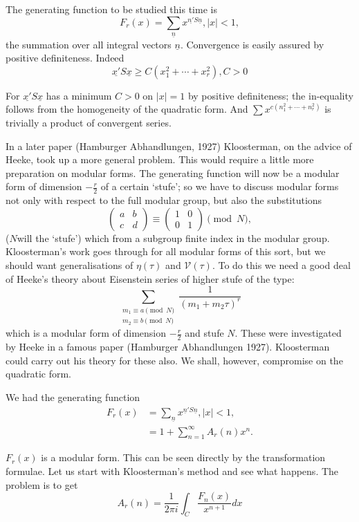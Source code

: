The generating function to be studied this time is 
$$
F_r (x) = \sum_{\underline{n}} x^{\underline{n'} S\underline{n}}, |x|<1,
$$
the summation over all integral vectors $\underline{n}$. Convergence
is easily assured by positive definiteness. Indeed
$$
\underline{x'} S\underline{x} \geq C(x_1^2 + \cdots + x_r^2), C>0
$$

For $\underline{x'} S \underline{x}$ has a minimum $C> 0$ on $|x|=1$
by positive definiteness; the in-equality follows from the homogeneity
of the quadratic form. And $\sum x^{c(n_1^2 + \cdots + n_r^2)}$ is
trivially a product of convergent series.

In a later paper (Hamburger Abhandlungen, 1927) Kloosterman, on the
advice of Heeke, took up a more general problem. This would require a
little more preparation on modular forms. The generating function will
now be a modular form of dimension $- \frac{r}{2}$ of a certain
`stufe'; so we have to discuss modular forms not only with respect to
the full modular group, but also the substitutions
$$
\begin{pmatrix} a & b\\ c & d\end{pmatrix} \equiv 
\begin{pmatrix} 1 & 0\\ 0 & 1\end{pmatrix} \pmod{N},
$$
($N$\pageoriginale will the `stufe') which from a subgroup finite index
  in the modular group. Kloosterman's work goes through for all
  modular forms of this sort, but we should want generalisations of
  $\eta(\tau)$ and $\mathscr{V}(\tau)$. To do this we need a good deal
  of Heeke's theory about Eisenstein series of higher stufe of the
  type:
$$
\sum_{\substack{m_1\equiv a\pmod{N}\\m_2\equiv b \pmod{N}}}
\frac{1}{(m_1 + m_2 \tau)^r}
$$
which is a modular form of dimension $- \frac{r}{2}$ and stufe
$N$. These were investigated by Heeke in a famous paper (Hamburger
Abhandlungen 1927). Kloosterman could carry out his theory for these
also. We shall, however, compromise on the quadratic form.

We had the generating function
\begin{align*}
  F_r (x) & = \sum_{\underline{n}} x^{\underline{n}'S \underline{n}},
  |x|<1,\\
  & = 1+ \sum^\infty_{n=1} A_r (n) x^n.
\end{align*}

$F_r(x)$ is a modular form. This can be seen directly by the
transformation formulae. Let us start with Kloosterman's method and
see what happens. The problem is to get
$$
A_r (n) = \frac{1}{2 \pi i} \int_C \frac{F_n(x)}{x^{n+1}} dx
$$

